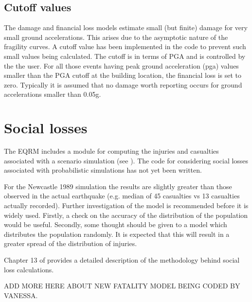 \subsection{Cutoff values}

The damage and financial loss models estimate small (but finite)
damage for very small ground accelerations. This arises due to the
asymptotic nature of the fragility curves. A cutoff value has been
implemented in the code to prevent such small values being
calculated. The cutoff is in terms of PGA and is controlled by the
the user. For all those events having peak ground acceleration (pga) values
smaller than the PGA cutoff at the building
location, the financial loss is set to zero. Typically it is
assumed that no damage worth reporting occurs for ground
accelerations smaller than 0.05g.


\section{Social losses}

The EQRM includes a module for computing the injuries and
casualties associated with a scenario simulation (see
). The code for considering social
losses associated with probabilistic simulations has not yet been
written. 

For the Newcastle 1989 simulation the results are slightly greater
than those observed in the actual earthquake (e.g. median of 45
casualties vs 13 casualties actually recorded). Further
investigation of the model is recommended before it is widely
used. Firstly, a check on the accuracy of the distribution of the
population would be useful. Secondly, some thought should be given
to a model which distributes the population randomly. It is
expected that this will result in a greater spread of the
distribution of injuries.

Chapter 13 of \cite{dr_FEMA99b} provides a detailed description of
the methodology behind social loss calculations.

ADD MORE HERE ABOUT NEW FATALITY MODEL BEING CODED BY VANESSA.

